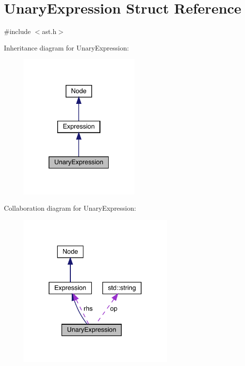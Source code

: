 \hypertarget{struct_unary_expression}{}\section{Unary\+Expression Struct Reference}
\label{struct_unary_expression}


{\ttfamily \#include $<$ast.\+h$>$}



Inheritance diagram for Unary\+Expression\+:\nopagebreak
\begin{figure}[H]
\begin{center}
\leavevmode
\includegraphics[width=172pt]{struct_unary_expression__inherit__graph}
\end{center}
\end{figure}


Collaboration diagram for Unary\+Expression\+:\nopagebreak
\begin{figure}[H]
\begin{center}
\leavevmode
\includegraphics[width=222pt]{struct_unary_expression__coll__graph}
\end{center}
\end{figure}
